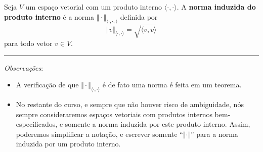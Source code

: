 \begin{definition}
	Seja $V$ um espaço vetorial com um produto interno $\langle\cdot,\cdot\rangle$. A \textbf{norma induzida do produto interno} é a norma $\Vert\cdot\Vert_{\langle\cdot,\cdot,\rangle}$ definida por
	\[\Vert v\Vert_{\langle\cdot,\cdot\rangle}=\sqrt{\langle v,v\rangle}\]
	para todo vetor $v\in V$.
	
	\hrule
	
	\textit{Observações}:
	\begin{itemize}
		\item A verificação de que $\Vert\cdot\Vert_{\langle\cdot,\cdot\rangle}$ é de fato uma norma é feita em um teorema.
		\item No restante do curso, e sempre que não houver risco de ambiguidade, nós sempre consideraremos espaços vetoriais com produtos internos bem-especificados, e somente a norma induzida por este produto interno. Assim, poderemos simplificar a notação, e escrever somente ``$\Vert\cdot\Vert$'' para a norma induzida por um produto interno.
	\end{itemize}
\end{definition}